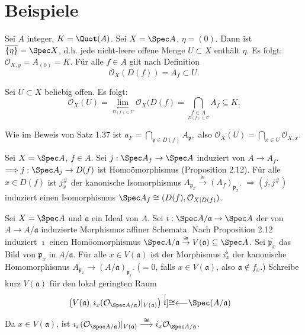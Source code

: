 \section{Beispiele}
\begin{example}[36, Integritätsbereiche]
  Sei $A$ integer, $K=\Quot(A)$. Sei $X=\Spec A$, $\eta=(0)$. Dann
  ist$\overline{\{\eta\}}=\Spec X$, d.h. jede nicht-leere offene Menge
  $U\subset X$ enthält $\eta$. Es folgt: $\mathcal{O}_{X,y}=A_{(0)}=K$.
  Für alle $f\in A$ gilt nach Definition 
  \[
    \mathcal{O}_{X}(D(f))=A_{f}\subset U.
  \]

  Sei $U\subset X$ beliebig offen. Es folgt:
  \[
    \mathcal{O}_{X}(U)=\underset{\underset{D(f)\subset U}{\longleftarrow}}{\lim}\mathcal{O}_{X}(D(f)=\bigcap_{\underset{D(f)\subset U}{f\in A}}A_{f}\subseteq K.
  \]

  Wie im Beweis von Satz 1.37 ist $a_{F}=\bigcap_{\mathfrak{p}\in D(f)}A_{\mathfrak{p}},$
  also $\mathcal{O}_{X}(U)=\bigcap_{x\in U}\mathcal{O}_{X,x}$.
\end{example}

\begin{example}
  Sei $X=\Spec A$, $f\in A$. Sei $j:\Spec A_{f}\rightarrow\Spec A$
  induziert von $A\rightarrow A_{f}$. $\Longrightarrow j:\Spec A_{j}\rightarrow D(f)$
  ist Homoömorphismus (Proposition 2.12). Für alle $x\in D(f)$ ist
  $j_{x}^{\#}$ der kanonische Isomorphismus $A_{\mathfrak{p}_{x}}\overset{\cong}{\rightarrow}(A_{f})_{\mathfrak{p}_{x}}$.
  $\Longrightarrow(j,j^{\#})$ induziert einen Isomorphismus $\Spec A_{f}\cong(D(f),\mathcal{O}_{X|D(f)})$.
\end{example}

\begin{example}
  Sei $X=\Spec A$ und $\mathfrak{a}$ ein Ideal von $A$. Sei $\imath:\Spec A/\mathfrak{a}\rightarrow\Spec A$
  der von $A\rightarrow A/\mathfrak{a}$ induzierte Morphismus affiner
  Schemata. Nach Proposition 2.12 induziert $\imath$ einen Homöomorphismus
  $\Spec A/\mathfrak{a}\overset{\cong}{\rightarrow}V(\mathfrak{a})\subseteq\Spec A$.
  Sei $\overline{\mathfrak{p}_{x}}$ das Bild von $\mathfrak{p}_{x}$
  in $A/\mathfrak{a}$. Für alle $x\in V(\mathfrak{a})$ ist der Morphismus
  $i_{x}^{\flat}$ der kanonische Homomorphismus $A_{\mathfrak{p}_{x}}\rightarrow(A/\mathfrak{a})_{\overline{\mathfrak{p_{x}}}}$.
  ($=0$, falls $x\in V(\mathfrak{a})$, also $\mathfrak{a}\notin f_{x}$.)
  Schreibe kurz $V(\mathfrak{a})$ für den lokal geringten Raum 
  \begin{align*}
    \left(V(\mathfrak{a}),\imath_{x}(\mathcal{O}_{\Spec A/\mathfrak{a}})|_{V(\mathfrak{a})}\right) & \stackrel[\imath]{\cong}{\longleftarrow}\Spec(A/\mathfrak{a})
  \end{align*}

  Da $x\in V(\mathfrak{a})$, ist $\imath_{x}(\mathcal{O}_{\Spec A/\mathfrak{a}})|_{V(\mathfrak{a})}\overset{\cong}{\longrightarrow}i_{x}\mathcal{O}_{\Spec A/\mathfrak{a}}$.
\end{example}

